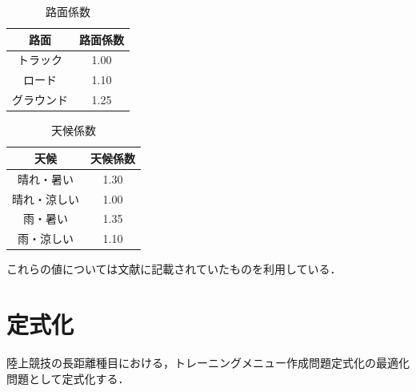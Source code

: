 \documentclass[12pt,fleqn]{jreport}
\begin{document}
\begin{longtable}{|c|c|}
  \caption{路面係数}    \\
  \hline
  路面       & 路面係数 \\
  \hline
  トラック   & 1.00     \\
  \hline
  ロード     & 1.10     \\
  \hline
  グラウンド & 1.25     \\
  \hline
\end{longtable}
\newpage
\begin{longtable}{|c|c|}
  \caption{天候係数}      \\
  \hline
  天候         & 天候係数 \\
  \hline
  晴れ・暑い   & 1.30     \\
  \hline
  晴れ・涼しい & 1.00     \\
  \hline
  雨・暑い     & 1.35     \\
  \hline
  雨・涼しい   & 1.10     \\
  \hline
\end{longtable}
これらの値については文献\cite{fitfig1}に記載されていたものを利用している．
\newpage
\chapter{定式化}

陸上競技の長距離種目における，トレーニングメニュー作成問題定式化の最適化問題として定式化する．
\vspace{1cm}
\end{document}

